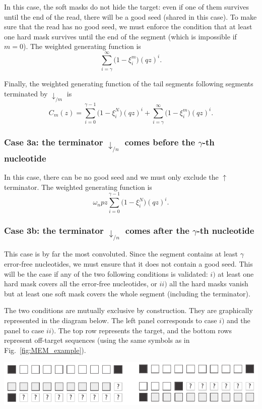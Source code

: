 \documentclass{article}
\newenvironment{inset}
{\vspace{0.5\baselineskip}\begin{center}}
{\end{center}\vspace{0.5\baselineskip}}
\begin{document}
In this case, the soft masks do not hide the target: even if one of them
survives until the end of the read, there will be a good seed (shared in
this case). To make sure that the read has no good seed, we must enforce
the condition that at least one hard mask survives until the end of the
segment (which is impossible if $m = 0$). The weighted generating function
is
\begin{equation*}
\sum_{i=\gamma}^\infty \Big(1 - \xi_i^m \Big) (qz)^i.
\end{equation*}

Finally, the weighted generating function of the tail segments following
segments terminated by $\downarrow_{/m}$ is
\begin{equation}
\label{eq:C}
C_m(z) =
\sum_{i=0}^{\gamma-1} \Big(1 - \xi_i^N \Big) (qz)^i +
  \sum_{i=\gamma}^\infty \Big(1 - \xi_i^m \Big) (qz)^i.
\end{equation}

\subsubsection*{Case 3a: the terminator $\downarrow_{/n}$ comes before the
$\gamma$-th nucleotide}

In this case, there can be no good seed and we must only exclude the
$\uparrow$ terminator. The weighted generating function is
\begin{equation}
\omega_n pz \sum_{i=0}^{\gamma-1} \Big(1 - \xi_i^N \Big) (qz)^i.
\end{equation}

\subsubsection*{Case 3b: the terminator $\downarrow_{/n}$ comes after the
$\gamma$-th nucleotide}

This case is by far the most convoluted. Since the segment contains at
least $\gamma$ error-free nucleotides, we must ensure that it does not
contain a good seed. This will be the case if any of the two following
conditions is validated: $i)$ at least one hard mask covers all the
error-free nucleotides, or $ii)$ all the hard masks vanish but at least
one soft mask covers the whole segment (including the terminator).

The two conditions are mutually exclusive by construction. They are
graphically represented in the diagram below. The left panel corresponds
to case $i)$ and the panel to case $ii)$. The top row represents the
target, and the bottom rows represent off-target sequences (using the same
symbols as in Fig.~\ref{fig:MEM_example}).
\begin{inset}
\includegraphics{masks.pdf}
\end{inset}
\end{document}
